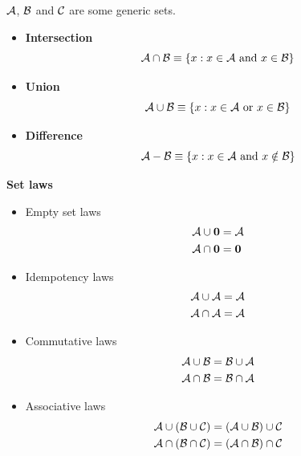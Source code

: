 \documentclass[justified,sixbynine]{tufte-book}
\def\subsubsection#1{{\bf #1}}
\theoremstyle{plain}%
\theoremstyle{definition}
\theoremstyle{remark}
\begin{document}
\begin{fullwidth}
${\cal A}$, ${\cal B}$ and ${\cal C}$ are some generic sets.

\begin{itemize}
\item  {\bf Intersection}
\begin{equation}
{\cal A}\cap {\cal B}\equiv \{x:x\in {\cal A}\text{ and }x\in
{\cal B}\}
\end{equation}

\item  {\bf Union}
\begin{equation}
{\cal A}\cup {\cal B}\equiv \{x:x\in {\cal A}\text{ or }x\in {\cal %
B}\}
\end{equation}

\item  {\bf Difference}
\begin{equation}
{\cal A}-{\cal B}\equiv \{x:x\in {\cal A}\text{ and }x\notin {\cal %
B}\}
\end{equation}
\end{itemize}

\subsubsection{Set laws}

\begin{itemize}
\item  Empty set laws
\begin{align}
{\cal A}\cup {\bf 0} &= {\cal A} \\
{\cal A}\cap {\bf 0} &= {\bf 0}
\end{align}

\item  Idempotency laws
\begin{align}
{\cal A}\cup {\cal A} &= {\cal A} \\
{\cal A}\cap {\cal A} &= {\cal A}
\end{align}

\item  Commutative laws
\begin{align}
{\cal A}\cup {\cal B} &= {\cal B}\cup {\cal A} \\
{\cal A}\cap {\cal B} &= {\cal B}\cap {\cal A}
\end{align}

\item  Associative laws
\begin{align}
{\cal A}\cup ({\cal B}\cup {\cal C}) &= ({\cal A}\cup {\cal B})\cup {\cal C} \\
{\cal A}\cap ({\cal B\cap C}) &= ({\cal A\cap B})\cap {\cal C}
\end{align}


\end{itemize}
\end{fullwidth}
\end{document}
